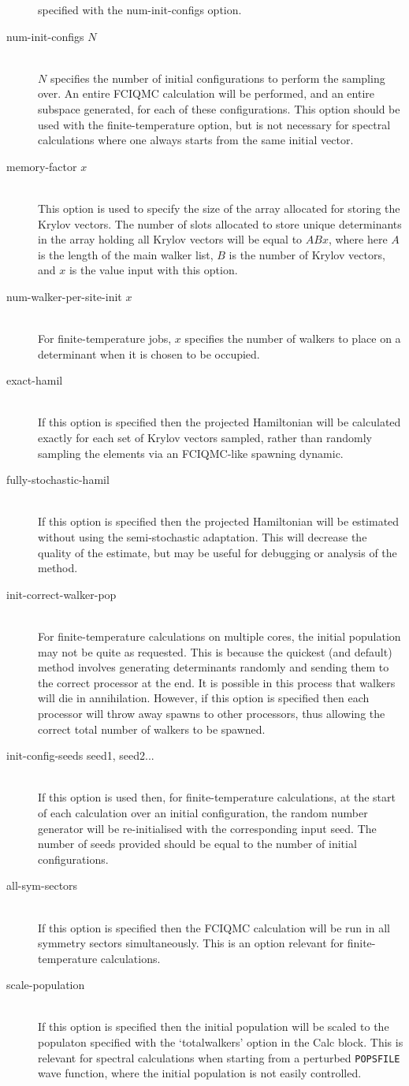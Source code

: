 \documentclass[a4paper,notitlepage]{scrreprt}
\newcommand\codeitem[1]{\needspace{1.5\baselineskip}\item[\textnormal{\ttfamily #1 \nopagebreak}] \hfill \\ \nopagebreak}
\begin{document}
\begin{description}
    specified with the num-init-configs option.
    \codeitem{num-init-configs $N$}
    $N$ specifies the number of initial configurations to perform the
    sampling over. An entire FCIQMC calculation will be performed, and
    an entire subspace generated, for each of these configurations.
    This option should be used with the finite-temperature option, but
    is not necessary for spectral calculations where one always starts
    from the same initial vector.
    \codeitem{memory-factor $x$}
    This option is used to specify the size of the array allocated for
    storing the Krylov vectors. The number of slots allocated to store
    unique determinants in the array holding all Krylov vectors will be
    equal to $ABx$, where here $A$ is the length of the main walker
    list, $B$ is the number of Krylov vectors, and $x$ is the value input
    with this option.
    \codeitem{num-walker-per-site-init $x$}
    For finite-temperature jobs, $x$ specifies the number of walkers to
    place on a determinant when it is chosen to be occupied.
    \codeitem{exact-hamil}
    If this option is specified then the projected Hamiltonian will
    be calculated exactly for each set of Krylov vectors sampled,
    rather than randomly sampling the elements via an FCIQMC-like
    spawning dynamic.
    \codeitem{fully-stochastic-hamil}
    If this option is specified then the projected Hamiltonian will be
    estimated without using the semi-stochastic adaptation. This will
    decrease the quality of the estimate, but may be useful for
    debugging or analysis of the method.
    \codeitem{init-correct-walker-pop}
    For finite-temperature calculations on multiple cores, the initial
    population may not be quite as requested. This is because the
    quickest (and default) method involves generating determinants
    randomly and sending them to the correct processor at the end. It
    is possible in this process that walkers will die in annihilation.
    However, if this option is specified then each processor will throw
    away spawns to other processors, thus allowing the correct total
    number of walkers to be spawned.
    \codeitem{init-config-seeds seed1, seed2...}
    If this option is used then, for finite-temperature calculations,
    at the start of each calculation over an initial configuration,
    the random number generator will be re-initialised with the
    corresponding input seed. The number of seeds provided should be
    equal to the number of initial configurations.
    \codeitem{all-sym-sectors}
    If this option is specified then the FCIQMC calculation will be
    run in all symmetry sectors simultaneously. This is an option
    relevant for finite-temperature calculations.
    \codeitem{scale-population}
    If this option is specified then the initial population will be
    scaled to the populaton specified with the `totalwalkers' option
    in the Calc block. This is relevant for spectral calculations when
    starting from a perturbed \texttt{POPSFILE} wave function, where the
    initial population is not easily controlled.
  \end{description}
\end{document}
